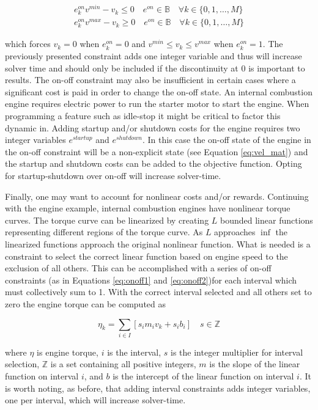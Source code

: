 \documentclass[12pt]{article}
\begin{document}
\begin{gather}
	e_k^{on}v^{min}-v_k\leq 0 \quad e^{on}\in \mathbb{B} \quad \forall k\in \{0,1,\dots,M\}\label{eq:onoff1}\\
	e_k^{on}v^{max}-v_k\geq 0 \quad e^{on}\in \mathbb{B} \quad \forall k\in \{0,1,\dots,M\}\label{eq:onoff2}
\end{gather}

which forces $v_k=0$ when $e_k^{on}=0$ and $v^{min}\leq v_k\leq v^{max}$ when $e_k^{on}=1$. The previously presented constraint adds one integer variable and thus will increase solver time and should only be included if the discontinuity at 0 is important to results. The on-off constraint may also be insufficient in certain cases where a significant cost is paid in order to change the on-off state. An internal combustion engine requires electric power to run the starter motor to start the engine. When programming a feature such as idle-stop it might be critical to factor this dynamic in. Adding startup and/or shutdown costs for the engine requires two integer variables $e^{startup}$ and $e^{shutdown}$. In this case the on-off state of the engine in the on-off constraint will be a non-explicit state (see Equation \eqref{eq:vel_mat}) and the startup and shutdown costs can be added to the objective function. Opting for startup-shutdown over on-off will increase solver-time.

Finally, one may want to account for nonlinear costs and/or rewards. Continuing with the engine example, internal combustion engines have nonlinear torque curves. The torque curve can be linearized by creating $L$ bounded linear functions representing different regions of the torque curve. As $L$ approaches $\inf$ the linearized functions approach the original nonlinear function. What is needed is a constraint to select the correct linear function based on engine speed to the exclusion of all others. This can be accomplished with a series of on-off constraints (as in Equations \eqref{eq:onoff1} and \eqref{eq:onoff2})for each interval which must collectively sum to 1. With the correct interval selected and all others set to zero the engine torque can be computed as

\begin{equation}
	\eta_k=\sum_{i\in I}[s_im_iv_k+s_ib_i]\quad s\in\mathbb{Z}
\end{equation}

where $\eta$ is engine torque, $i$ is the interval, $s$ is the integer multiplier for interval selection, $\mathbb{Z}$ is a set containing all positive integers, $m$ is the slope of the linear function on interval $i$, and $b$ is the intercept of the linear function on interval $i$. It is worth noting, as before, that adding interval constraints adds integer variables, one per interval, which will increase solver-time.
\end{document}

